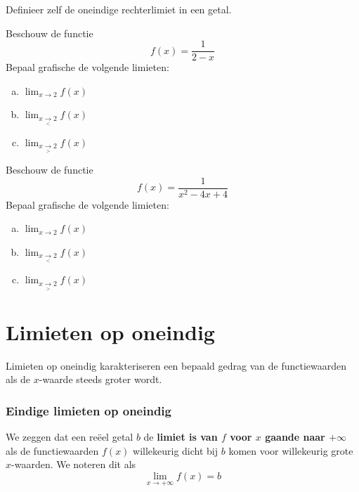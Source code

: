 \documentclass[12pt]{article}
\newenvironment{definitie}
{
  \vspace{0.4cm}
  \begin{mdframed}[nobreak=true,frametitle={Definitie}]
  }{%
  \end{mdframed}
}
\begin{document}
\begin{oefening}
  Definieer zelf de oneindige rechterlimiet in een getal.
\end{oefening}

\begin{oefening}
Beschouw de functie
$$f(x)=\dfrac{1}{2-x}$$
Bepaal grafische de volgende limieten:
\begin{enumerate}[(a)]
  \itemsep.5em
  \item $\displaystyle\lim_{x\to 2} f(x)$
  \item $\displaystyle\lim_{x\underset{<}{\to} 2} f(x)$
  \item $\displaystyle\lim_{x\underset{>}{\to} 2} f(x)$
\end{enumerate}
\end{oefening}

\begin{oefening}
Beschouw de functie
$$f(x)=\dfrac{1}{x^2-4x+4}$$
Bepaal grafische de volgende limieten:
\begin{enumerate}[(a)]
  \itemsep.5em
  \item $\displaystyle\lim_{x\to 2} f(x)$
  \item $\displaystyle\lim_{x\underset{<}{\to} 2} f(x)$
  \item $\displaystyle\lim_{x\underset{>}{\to} 2} f(x)$
\end{enumerate}
\end{oefening}

\pagebreak
\section{Limieten op oneindig}

\begin{theorie}
Limieten op oneindig karakteriseren een bepaald gedrag van de functiewaarden als de $x$-waarde steeds groter wordt.

\subsubsection*{Eindige limieten op oneindig}

\begin{definitie}
  We zeggen dat een reëel getal $b$ de {\bf limiet is van $f$ voor $x$ gaande naar $+\infty$} als de functiewaarden $f(x)$ willekeurig dicht bij $b$ komen voor willekeurig grote $x$-waarden. We noteren dit als
  $$\lim_{x\to +\infty} f(x)=b$$
\end{definitie}

\end{theorie}
\end{document}
